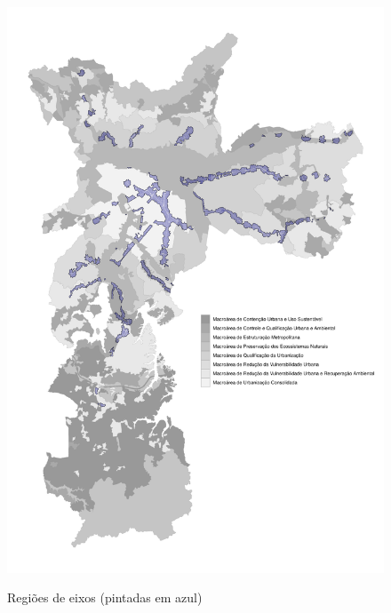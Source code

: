 \begin{apendicesenv}
\begin{figure}[!h]
    \centering
    \caption{Regiões de eixos (pintadas em azul)}
    \includegraphics[width = .85\linewidth]{figuras/macroareas-eixos.pdf}
    \label{fig:eixos}
\end{figure}



\end{apendicesenv}
    
    